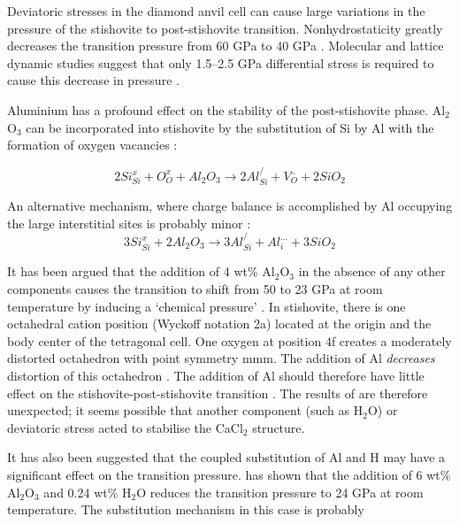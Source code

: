 \documentclass[review]{elsarticle}
\begin{document}
Deviatoric stresses in the diamond anvil cell can cause large variations in the pressure of the stishovite to post-stishovite transition. Nonhydrostaticity greatly decreases the transition pressure from 60 GPa \citep{AAML2003, HSCHMK2000} to 40 GPa \citep{KMH1996, SAB2012}. Molecular and lattice dynamic studies suggest that only 1.5--2.5 GPa differential stress is required to cause this decrease in pressure \citep{DB1996}.

Aluminium has a profound effect on the stability of the post-stishovite phase. Al$_2$O$_3$ can be incorporated into stishovite by the substitution of Si by Al with the formation of oxygen vacancies \citep{SSP1995,HTSO2005,BBB2006}:

\begin{equation}
2Si^x_{Si} + O^x_O + Al_2O_3 \rightarrow 2Al^/_{Si} + V^{..}_O + 2SiO_2
\end{equation}

An alternative mechanism, where charge balance is accomplished by Al occupying the large interstitial sites is probably minor \cite{SSP1995}:
\begin{equation}
3Si^x_{Si} + 2Al_2O_3 \rightarrow 3Al^/_{Si} + Al^{...}_i + 3SiO_2
\end{equation}

It has been argued that the addition of 4 wt\% Al$_2$O$_3$ in the absence of any other components causes the transition to shift from 50 to 23 GPa at room temperature by inducing a `chemical pressure' \citep{BAAG2009}. In stishovite, there is one octahedral cation position (Wyckoff notation 2a) located at the origin and the body center of the tetragonal cell. One oxygen at position 4f creates a moderately distorted octahedron with point symmetry mmm. The addition of Al \emph{decreases} distortion of this octahedron \citep{SSP1995}. The addition of Al should therefore have little effect on the stishovite-post-stishovite transition \citep{Panero2006}. The results of \cite{BAAG2009} are therefore unexpected; it seems possible that another component (such as H$_2$O) or deviatoric stress acted to stabilise the CaCl$_2$ structure.

It has also been suggested that the coupled substitution of Al and H may have a significant effect on the transition pressure. \cite{Lakshtanovetal2007} has shown that the addition of 6 wt\% Al$_2$O$_3$ and 0.24 wt\% H$_2$O reduces the transition pressure to 24 GPa at room temperature. The substitution mechanism in this case is probably
\end{document}
